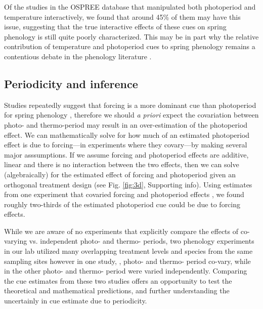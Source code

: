 \documentclass[11pt]{article}
\begin{document}
{Of the studies in the OSPREE database that manipulated both photoperiod and temperature interactively, we found that around 45\% of them may have this issue, suggesting that the true interactive effects of these cues on spring phenology is still quite poorly characterized. This may be in part why the relative contribution of temperature and photoperiod cues to spring phenology remains a contentious debate in the phenology literature \citep{koerner2010a}.

\subsection*{Periodicity and inference}
Studies repeatedly suggest that forcing is a more dominant cue than photoperiod for spring phenology \citep{CHUINE:2010wg}, therefore we should \emph{a priori} expect the covariation between photo- and thermo-period may result in an over-estimation of the photoperiod effect. %
We can mathematically solve for how much of an estimated photoperiod effect is due to forcing---in experiments where they covary---by making several major asssumptions. If we assume forcing and photoperiod effects are additive, linear and there is no interaction between the two effects, then we can solve (algebraically) for the estimated effect of forcing and photoperiod given an orthogonal treatment design (see Fig. \ref{fig:3d}, Supporting info). Using estimates from one experiment that covaried forcing and photoperiod effects \citet{Flynn2018}, we found roughly two-thirds of the estimated photoperiod cue could be due to forcing effects. %

While we are aware of no experiments that explicitly compare the effects of co-varying vs. independent photo- and thermo- periods, two phenology experiments in our lab utilized many overlapping treatment levels and species from the same sampling sites however in one study, \citet{Flynn2018}, photo- and thermo- period co-vary, while in the other \citet{Buonaiuto:2021ug}  photo- and thermo- period were varied independently. Comparing the cue estimates from these two studies offers an opportunity to test the theoretical and mathematical predictions, and further understanding the uncertainly in cue estimate due to periodicity.

}
\end{document}
